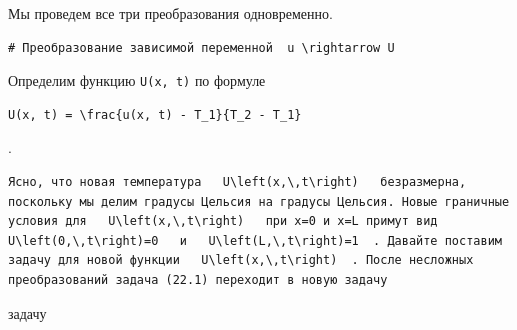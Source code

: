 \documentclass[
  ukrainian,
]{article}
\begin{document}
Мы проведем все три преобразования одновременно.

\begin{verbatim}
# Преобразование зависимой переменной  u \rightarrow U
\end{verbatim}

Определим функцию \texttt{U(x,\ t)} по формуле

\begin{verbatim}
U(x, t) = \frac{u(x, t) - T_1}{T_2 - T_1}
\end{verbatim}

.

\begin{verbatim}
Ясно, что новая температура   U\left(x,\,t\right)   безразмерна, поскольку мы делим градусы Цельсия на градусы Цельсия. Новые граничные условия для   U\left(x,\,t\right)   при x=0 и x=L примут вид   U\left(0,\,t\right)=0   и   U\left(L,\,t\right)=1  . Давайте поставим задачу для новой функции   U\left(x,\,t\right)  . После несложных преобразований задача (22.1) переходит в новую задачу
\end{verbatim}

задачу
\end{document}
